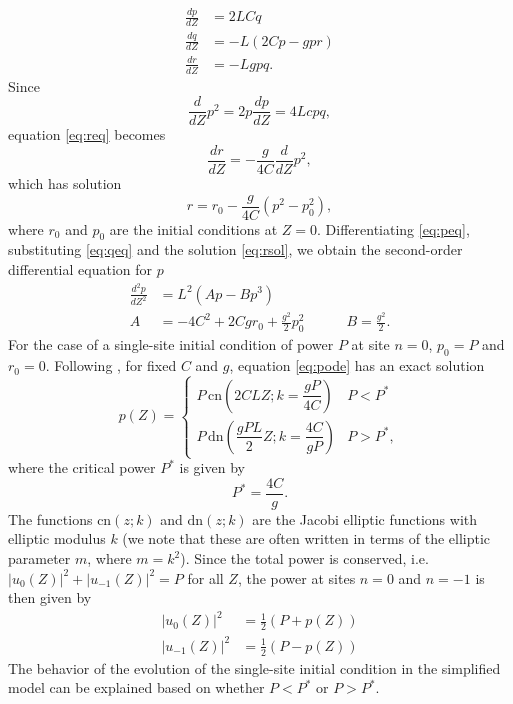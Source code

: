 \documentclass[reprint, amsmath,amssymb,aps,pre]{revtex4-2}
\begin{document}
\begin{align}
\frac{dp}{dZ} &= 2LCq \label{eq:peq}\\
\frac{dq}{dZ} &= -L(2Cp - gpr) \label{eq:qeq}\\
\frac{dr}{dZ} &= -Lgpq. \label{eq:req}
\end{align}
Since
\[
\frac{d}{dZ}p^2 = 2p \frac{dp}{dZ} = 4Lcpq,
\]
equation \cref{eq:req} becomes
\[
\frac{dr}{dZ} = -\frac{g}{4C}\frac{d}{dZ}p^2,
\]
which has solution
\begin{equation}\label{eq:rsol}
r = r_0 - \frac{g}{4C}\left( p^2 - p_0^2 \right),
\end{equation}
where $r_0$ and $p_0$ are the initial conditions at $Z=0$. Differentiating \cref{eq:peq}, substituting \cref{eq:qeq} and the solution \cref{eq:rsol}, we obtain the second-order differential equation for $p$
\begin{equation}\label{eq:pode}
\begin{aligned}
\frac{d^2p}{dZ^2} &= L^2 \left( A p - B p^3 \right) \\
A &= -4C^2 + 2Cgr_0 + \frac{g^2}{2}p_0^2
\qquad\quad B = \frac{g^2}{2}.
\end{aligned}
\end{equation}
For the case of a single-site initial condition of power $P$ at site $n=0$, $p_0 = P$ and $r_0 = 0$. Following \cite{Kenkre1986}, for fixed $C$ and $g$, equation \cref{eq:pode} has an exact solution
\begin{equation}\label{eq:psol}
p(Z) =
\begin{cases}
P\,\text{cn}\left(2CLZ ; k=\dfrac{g P}{4C} \right) & P < P^*\\
P\,\text{dn}\left(\dfrac{g P L}{2}Z ; k=\dfrac{4C}{g P} \right) & P > P^*,
\end{cases}
\end{equation}
where the critical power $P^*$ is given by
\begin{equation}\label{eq:pstar}
P^* = \dfrac{4C}{g}.
\end{equation}
The functions $\text{cn}(z ; k)$ and $\text{dn}(z ; k)$ are the Jacobi elliptic functions with elliptic modulus $k$ (we note that these are often written in terms of the elliptic parameter $m$, where $m = k^2$). Since the total power is conserved, i.e. $|u_0(Z)|^2 + |u_{-1}(Z)|^2 = P$ for all $Z$, the power at sites $n=0$ and $n=-1$ is then given by
\begin{equation}\label{eq:u0u-1}
\begin{aligned}
|u_0(Z)|^2 &= \frac{1}{2}\left( P + p(Z) \right)\\
|u_{-1}(Z)|^2 &= \frac{1}{2}\left( P - p(Z) \right)
\end{aligned}
\end{equation}
The behavior of the evolution of the single-site initial condition in the simplified model can be explained based on whether $P < P^*$ or $P > P^*$.
\end{document}
